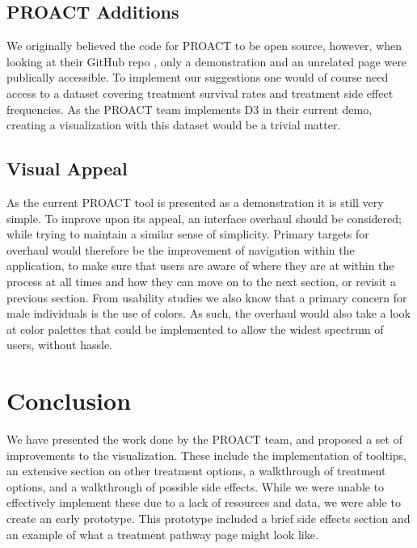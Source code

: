 \documentclass[journal]{vgtc}                %
\begin{document}
        \subsection{PROACT Additions}
                We originally believed the code for PROACT to be open source, however, when looking at their GitHub repo \cite{PROACTDemo:2016}, only a demonstration and an unrelated page were publically accessible.
                To implement our suggestions one would of course need access to a dataset covering treatment survival rates and treatment side effect frequencies.
                As the PROACT team implements D3 in their current demo, creating a visualization with this dataset would be a trivial matter.

        \subsection{Visual Appeal}
                As the current PROACT tool is presented as a demonstration it is still very simple.
                To improve upon its appeal, an interface overhaul should be considered; while trying to maintain a similar sense of simplicity.
                Primary targets for overhaul would therefore be the improvement of navigation within the application, to make sure that users are aware of where they are at within the process at all times and how they can move on to the next section, or revisit a previous section.
                From usability studies we also know that a primary concern for male individuals is the use of colors.
                As such, the overhaul would also take a look at color palettes that could be implemented to allow the widest spectrum of users, without hassle.

\section{Conclusion}
        We have presented the work done by the PROACT team, and proposed a set of improvements to the visualization.
        These include the implementation of tooltips, an extensive section on other treatment options, a walkthrough of treatment options, and a walkthrough of possible side effects.
        While we were unable to effectively implement these due to a lack of resources and data, we were able to create an early prototype.
        This prototype included a brief side effects section and an example of what a treatment pathway page might look like.

%

%
%
%


\end{document}
